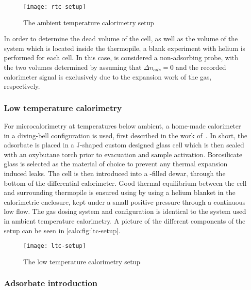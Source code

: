 \begin{figure}[htb]
    \centering
    \texttt{[image: rtc-setup]}%
    \caption{The ambient temperature calorimetry setup}%
    \label{calo:fig:rtc-setup}
\end{figure}

In order to determine the dead volume of the cell, as well 
as the volume of the system which is located inside the thermopile,
a blank experiment with helium is performed for each cell.
In this case,  is considered a non-adsorbing probe, with the 
two volumes determined by assuming that \(\Delta n_{ads} = 0\)
and the recorded calorimeter signal
is exclusively due to the expansion work of the gas, respectively.

\subsubsection{Low temperature calorimetry}\label{calo:ltc}

For microcalorimetry at temperatures below ambient, a home-made calorimeter
in a diving-bell configuration is used, first described in the work 
of~\citet{rouquerolCalorimetricEvidenceBidimensional1977}. In short,
the adsorbate is placed in a J-shaped custom designed glass cell which is
then sealed with an oxybutane torch prior to evacuation and sample 
activation. Borosilicate glass is selected as
the material of choice to prevent any thermal expansion induced leaks.
The cell is then introduced into a -filled dewar, through 
the bottom of the differential calorimeter. Good thermal equilibrium
between the cell and surrounding thermopile is ensured using by 
using a helium blanket in the calorimetric enclosure, kept under a small
positive pressure through a continuous low flow. The gas dosing system
and configuration is identical to the system used in ambient temperature
calorimetry. A picture of the different components of the 
setup can be seen in \autoref{calo:fig:ltc-setup}.

\begin{figure}[htb]
    \centering
    \texttt{[image: ltc-setup]}%
    \caption{The low temperature calorimetry setup}%
    \label{calo:fig:ltc-setup}
\end{figure}

\subsubsection{Adsorbate introduction}\label{calo:ads-intro}

